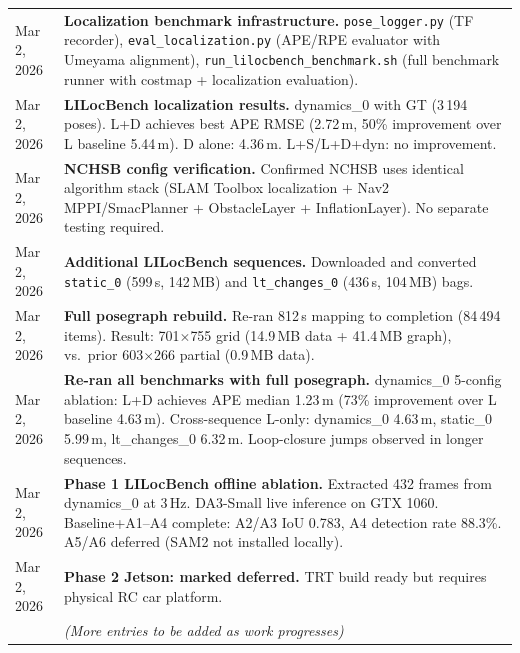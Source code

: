 \documentclass[11pt,a4paper]{article}
\begin{document}
\begin{longtable}{lp{10cm}}
Mar 2, 2026 & \textbf{Localization benchmark infrastructure.}
              \texttt{pose\_logger.py} (TF recorder),
              \texttt{eval\_localization.py} (APE/RPE evaluator with
              Umeyama alignment),
              \texttt{run\_lilocbench\_benchmark.sh} (full benchmark
              runner with costmap + localization evaluation). \\
Mar 2, 2026 & \textbf{LILocBench localization results.}  dynamics\_0
              with GT (3\,194 poses).  L+D achieves best APE RMSE
              (2.72\,m, 50\% improvement over L baseline 5.44\,m).
              D alone: 4.36\,m.  L+S/L+D+dyn: no improvement. \\
Mar 2, 2026 & \textbf{NCHSB config verification.}  Confirmed NCHSB
              uses identical algorithm stack (SLAM Toolbox localization +
              Nav2 MPPI/SmacPlanner + ObstacleLayer + InflationLayer).
              No separate testing required. \\
Mar 2, 2026 & \textbf{Additional LILocBench sequences.}  Downloaded
              and converted \texttt{static\_0} (599\,s, 142\,MB) and
              \texttt{lt\_changes\_0} (436\,s, 104\,MB) bags. \\
Mar 2, 2026 & \textbf{Full posegraph rebuild.}  Re-ran 812\,s mapping
              to completion (84\,494 items).  Result: 701$\times$755
              grid (14.9\,MB data + 41.4\,MB graph), vs.\ prior
              603$\times$266 partial (0.9\,MB data). \\
Mar 2, 2026 & \textbf{Re-ran all benchmarks with full posegraph.}
              dynamics\_0 5-config ablation: L+D achieves APE median
              1.23\,m (73\% improvement over L baseline 4.63\,m).
              Cross-sequence L-only: dynamics\_0 4.63\,m, static\_0
              5.99\,m, lt\_changes\_0 6.32\,m.  Loop-closure jumps
              observed in longer sequences. \\
Mar 2, 2026 & \textbf{Phase 1 LILocBench offline ablation.}  Extracted
              432 frames from dynamics\_0 at 3\,Hz.  DA3-Small live
              inference on GTX 1060.  Baseline+A1--A4 complete:
              A2/A3 IoU 0.783, A4 detection rate 88.3\%.
              A5/A6 deferred (SAM2 not installed locally). \\
Mar 2, 2026 & \textbf{Phase 2 Jetson: marked deferred.}  TRT build
              ready but requires physical RC car platform. \\
            & \textit{(More entries to be added as work progresses)} \\
\bottomrule
\end{longtable}
\end{document}
